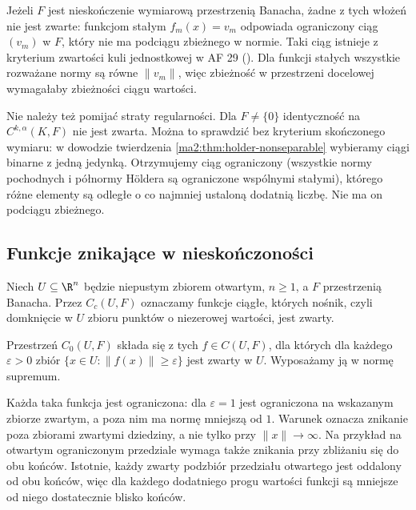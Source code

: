Jeżeli $F$ jest nieskończenie wymiarową
przestrzenią Banacha, żadne z tych włożeń
nie jest zwarte:
funkcjom stałym $f_m(x)=v_m$ odpowiada
ograniczony ciąg $(v_m)$ w $F$, który
nie ma podciągu zbieżnego w normie.
Taki ciąg istnieje z kryterium zwartości
kuli jednostkowej w AF 29
().
Dla funkcji stałych wszystkie rozważane
normy są równe $\|v_m\|$, więc zbieżność
w przestrzeni docelowej wymagałaby
zbieżności ciągu wartości.

Nie należy też pomijać straty regularności.
Dla $F\ne\{0\}$ identyczność na
$C^{k,\alpha}(K,F)$ nie jest zwarta.
Można to sprawdzić bez kryterium
skończonego wymiaru: w dowodzie twierdzenia
\ref{ma2:thm:holder-nonseparable} wybieramy
ciągi binarne z jedną jedynką.
Otrzymujemy ciąg ograniczony (wszystkie
normy pochodnych i półnormy H\"oldera
są ograniczone wspólnymi stałymi),
którego różne elementy są odległe
o co najmniej ustaloną dodatnią liczbę.
Nie ma on podciągu zbieżnego.

\subsection{Funkcje znikające w nieskończoności}

Niech $U\subseteq\R^n$ będzie niepustym
zbiorem otwartym, $n\ge1$, a $F$ przestrzenią
Banacha. Przez $C_c(U,F)$ oznaczamy funkcje
ciągłe, których nośnik, czyli domknięcie
w $U$ zbioru punktów o niezerowej wartości,
jest zwarty.

\begin{definicja}
\label{ma2:def:c0-functions}
Przestrzeń $C_0(U,F)$ składa się z tych
$f\in C(U,F)$, dla których dla każdego
$\varepsilon>0$ zbiór
$\{x\in U:\|f(x)\|\ge\varepsilon\}$
jest zwarty w $U$.
Wyposażamy ją w normę supremum.
\end{definicja}

Każda taka funkcja jest ograniczona:
dla $\varepsilon=1$ jest ograniczona
na wskazanym zbiorze zwartym, a poza nim
ma normę mniejszą od $1$.
Warunek oznacza znikanie poza zbiorami
zwartymi dziedziny, a nie tylko przy
$\|x\|\to\infty$. Na przykład na otwartym
ograniczonym przedziale wymaga także
znikania przy zbliżaniu się do obu końców.
Istotnie, każdy zwarty podzbiór przedziału
otwartego jest oddalony od obu końców,
więc dla każdego dodatniego progu wartości
funkcji są mniejsze od niego dostatecznie
blisko końców.

